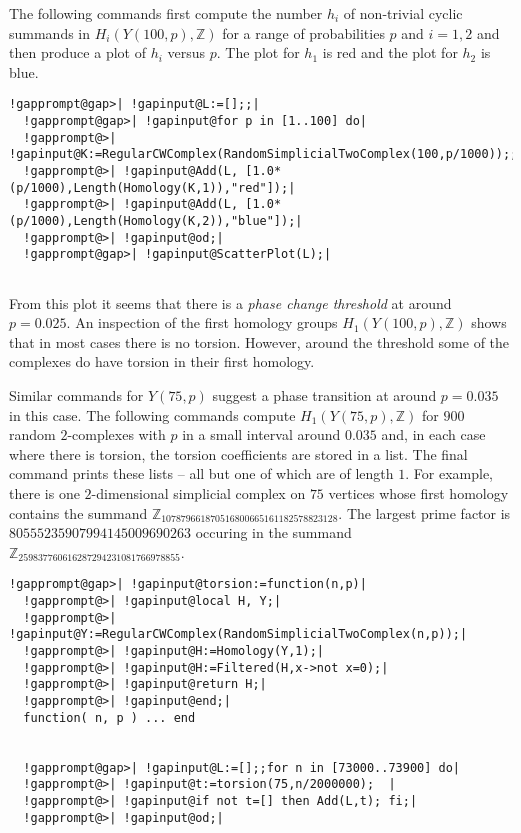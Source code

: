 \documentclass[a4paper,11pt]{report}
\begin{document}
{{The following commands first compute the number $h_i$ of non-trivial cyclic summands in $H_i(Y(100,p), \mathbb Z)$ for a range of probabilities $p$ and $i=1,2$ and then produce a plot of $h_i$ versus $p$. The plot for $h_1$ is red and the plot for $h_2$ is blue. 
\begin{Verbatim}[commandchars=!@|,fontsize=\small,frame=single,label=Example]
  !gapprompt@gap>| !gapinput@L:=[];;|
  !gapprompt@gap>| !gapinput@for p in [1..100] do|
  !gapprompt@>| !gapinput@K:=RegularCWComplex(RandomSimplicialTwoComplex(100,p/1000));;|
  !gapprompt@>| !gapinput@Add(L, [1.0*(p/1000),Length(Homology(K,1)),"red"]);|
  !gapprompt@>| !gapinput@Add(L, [1.0*(p/1000),Length(Homology(K,2)),"blue"]);|
  !gapprompt@>| !gapinput@od;|
  !gapprompt@gap>| !gapinput@ScatterPlot(L);|
  
\end{Verbatim}
 

  

From this plot it seems that there is a \emph{phase change threshold} at around $p=0.025$. An inspection of the first homology groups $H_1(Y(100,p), \mathbb Z)$ shows that in most cases there is no torsion. However, around the threshold
some of the complexes do have torsion in their first homology. 

Similar commands for $Y(75,p)$ suggest a phase transition at around $p=0.035$ in this case. The following commands compute $H_1(Y(75,p), \mathbb Z)$ for $900$ random $2$-complexes with $p$ in a small interval around $ 0.035$ and, in each case where there is torsion, the torsion coefficients are stored
in a list. The final command prints these lists -- all but one of which are of
length $1$. For example, there is one $2$-dimensional simplicial complex on $75$ vertices whose first homology contains the summand $\mathbb Z_{107879661870516800665161182578823128}$. The largest prime factor is $80555235907994145009690263$ occuring in the summand $\mathbb Z_{259837760616287294231081766978855}$. 
\begin{Verbatim}[commandchars=!@|,fontsize=\small,frame=single,label=Example]
  !gapprompt@gap>| !gapinput@torsion:=function(n,p)|
  !gapprompt@>| !gapinput@local H, Y;|
  !gapprompt@>| !gapinput@Y:=RegularCWComplex(RandomSimplicialTwoComplex(n,p));|
  !gapprompt@>| !gapinput@H:=Homology(Y,1);|
  !gapprompt@>| !gapinput@H:=Filtered(H,x->not x=0);|
  !gapprompt@>| !gapinput@return H;|
  !gapprompt@>| !gapinput@end;|
  function( n, p ) ... end
  
  
  !gapprompt@gap>| !gapinput@L:=[];;for n in [73000..73900] do|
  !gapprompt@>| !gapinput@t:=torsion(75,n/2000000);  |
  !gapprompt@>| !gapinput@if not t=[] then Add(L,t); fi;|
  !gapprompt@>| !gapinput@od;|
  

\end{Verbatim}}}
\end{document}
